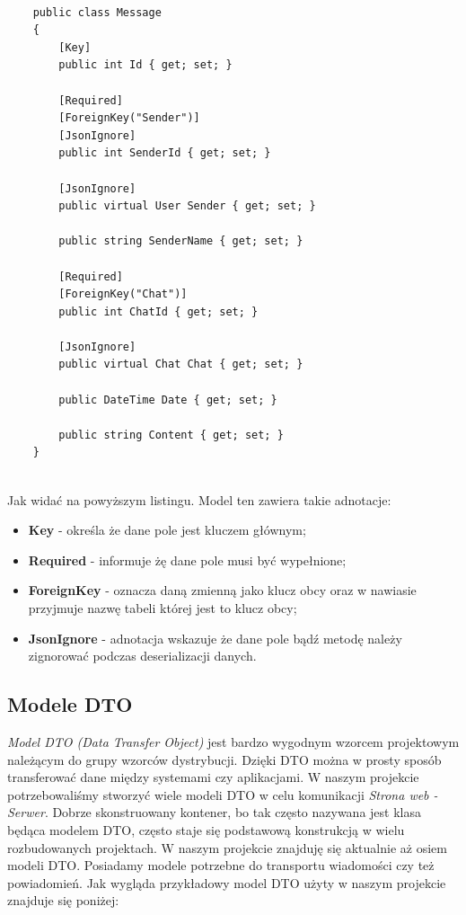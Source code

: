 \documentclass[12pt,a4paper]{article}
\begin{document}
\begin{lstlisting}[caption={Przykładowa klasa modelu tabeli - Message}]

	public class Message
	{
	 	[Key]
	 	public int Id { get; set; }
		
		[Required]
		[ForeignKey("Sender")]
		[JsonIgnore]
		public int SenderId { get; set; }
		
		[JsonIgnore]
		public virtual User Sender { get; set; }
		
		public string SenderName { get; set; }
		
		[Required]
		[ForeignKey("Chat")]
		public int ChatId { get; set; }
		
		[JsonIgnore]
		public virtual Chat Chat { get; set; }
		
		public DateTime Date { get; set; }
		
		public string Content { get; set; }
	}
	
\end{lstlisting}

\hspace*{0.7cm} Jak widać na powyższym listingu. Model ten zawiera takie adnotacje:
\begin{itemize}
	\item \textbf{Key} - określa że dane pole jest kluczem głównym;
	\item \textbf{Required} - informuje żę dane pole musi być wypełnione;
	\item \textbf{ForeignKey} - oznacza daną zmienną jako klucz obcy oraz w nawiasie przyjmuje nazwę tabeli której jest to klucz obcy;
	\item \textbf{JsonIgnore} - adnotacja wskazuje że dane pole bądź metodę należy zignorować podczas deserializacji danych.
\end{itemize}

\subsection{Modele DTO} 					%
\hspace*{0.7cm} \textit{Model DTO (Data Transfer Object)}  jest bardzo wygodnym wzorcem projektowym należącym do grupy wzorców dystrybucji. Dzięki DTO można w prosty sposób transferować dane między systemami czy aplikacjami. W naszym projekcie potrzebowaliśmy stworzyć wiele modeli DTO w celu komunikacji \textit{Strona web - Serwer}. Dobrze skonstruowany kontener, bo tak często nazywana jest klasa będąca modelem DTO, często staje się podstawową konstrukcją w wielu rozbudowanych projektach. W naszym projekcie znajduję się aktualnie aż osiem modeli DTO. Posiadamy modele potrzebne do transportu wiadomości czy też powiadomień. Jak wygląda przykładowy model DTO użyty w naszym projekcie znajduje się poniżej:\newline
\end{document}

